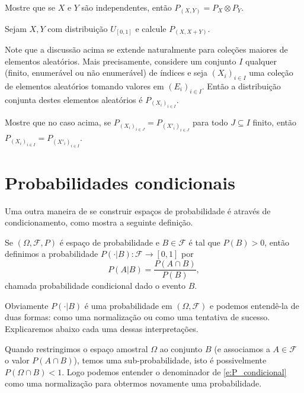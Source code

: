 \begin{exercise}
  Mostre que se $X$ e $Y$ são independentes, então $P_{(X,Y)} = P_X \otimes P_Y$.
\end{exercise}

\begin{exercise}
  Sejam $X, Y$ \iid com distribuição $U_{[0,1]}$ e calcule $P_{(X, X + Y)}$.
\end{exercise}

Note que a discussão acima se extende naturalmente para coleções maiores de elementos aleatórios.
Mais precisamente, considere um conjunto $I$ qualquer (finito, enumerável ou não enumerável) de índices e seja $(X_i)_{i \in I}$ uma coleção de elementos aleatórios tomando valores em $(E_i)_{i \in I}$.
Então a distribuição conjunta destes elementos aleatórios é $P_{(X_i)_{i \in I}}$.

\begin{exercise}
  Mostre que no caso acima, se $P_{(X_i)_{i \in J}} = P_{(X'_i)_{i \in J}}$ para todo $J \subseteq I$ finito, então $P_{(X_i)_{i \in I}} = P_{(X'_i)_{i \in I}}$.
\end{exercise}

\section{Probabilidades condicionais}

Uma outra maneira de se construir espaços de probabilidade é através de condicionamento, como mostra a seguinte definição.
\begin{definition}
  Se $(\Omega, \mathcal{F}, P)$ é espaço de probabilidade e $B \in \mathcal{F}$ é tal que $P(B) > 0$, então definimos a probabilidade  $P(\cdot | B): \mathcal{F} \to [0,1]$ por
  \begin{equation}
    \label{e:P_condicional}
    P(A | B) = \frac{P(A \cap B)}{P(B)},
  \end{equation}
  chamada probabilidade condicional dado o evento $B$.
\end{definition}

Obviamente $P(\cdot | B)$ é uma probabilidade em $(\Omega, \mathcal{F})$ e podemos entendê-la de duas formas: como uma normalização ou como uma tentativa de sucesso.
Explicaremos abaixo cada uma dessas interpretações.

Quando restringimos o espaço amostral $\Omega$ ao conjunto $B$ (e associamos a $A \in \mathcal{F}$ o valor $P(A \cap B)$), temos uma sub-probabilidade, isto é possivelmente $P(\Omega \cap B) < 1$.
Logo podemos entender o denominador de \eqref{e:P_condicional} como uma normalização para obtermos novamente uma probabilidade.

